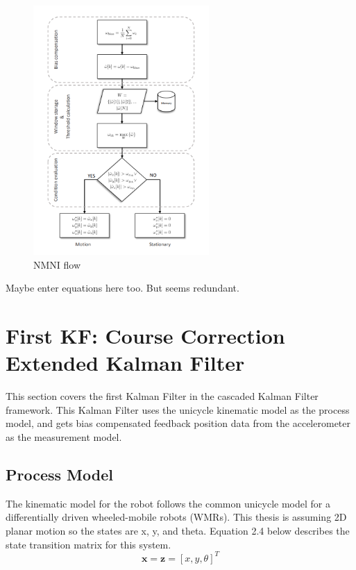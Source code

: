 \begin{figure}
  \centerline{\includegraphics[height=95mm]{temp_NMNI.PNG}}
  \caption[NMNI Flow]{
    NMNI flow
    }
  \label{fig:NMNI}
\end{figure}

Maybe enter equations here too. But seems redundant.


\section{First KF: Course Correction Extended Kalman Filter}

This section covers the first Kalman Filter in the cascaded Kalman Filter framework.
This Kalman Filter uses the unicycle kinematic model as the process model, and gets
bias compensated feedback position data from the accelerometer as the measurement 
model. 

\subsection{Process Model}

The kinematic model for the robot follows the common unicycle model for a 
differentially driven wheeled-mobile robots (WMRs). This thesis is assuming 2D planar 
motion so the states are x, y, and theta. Equation 2.4 below describes the state 
transition matrix for this system. 
\\
\begin{equation}
  \boldsymbol{x} = \boldsymbol{z} = [x, y, \theta]^T
\end{equation}

